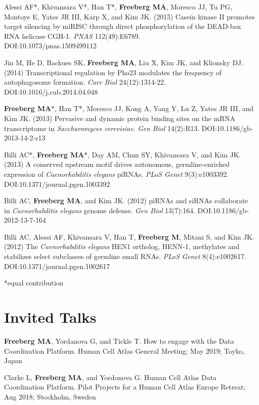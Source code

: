 \documentclass[margin,line]{res}
\begin{document}
\begin{resume}
Alessi AF*, Khivansara V*, Han T*, {\bf Freeberg MA}, Moresco JJ, Tu PG, Montoye E, Yates JR III, Karp X, and Kim JK. (2015) Casein kinase II promotes target silencing by miRISC through direct phosphorylation of the DEAD-box RNA helicase CGH-1. {\em PNAS} 112(49):E6789. \\DOI:10.1073/pnas.1509499112

Jin M, He D, Backues SK, {\bf Freeberg MA}, Liu X, Kim JK, and Klionsky DJ. (2014) Transcriptional regulation by Pho23 modulates the frequency of autophagosome formation. {\em Curr Biol} 24(12):1314-22. DOI:10.1016/j.cub.2014.04.048

{\bf Freeberg MA}*, Han T*, Moresco JJ, Kong A, Yang Y, Lu Z, Yates JR III, and Kim JK. (2013) Pervasive and dynamic protein binding sites on the mRNA transcriptome in {\em Saccharomyces cerevisiae}. {\em Gen Biol} 14(2):R13. DOI:10.1186/gb-2013-14-2-r13

Billi AC*, {\bf Freeberg MA}*, Day AM, Chun SY, Khivansara V, and Kim JK. (2013) A conserved upstream motif drives autonomous, germline-enriched expression of {\em Caenorhabditis elegans} piRNAs. {\em PLoS Genet} 9(3):e1003392. DOI:10.1371/journal.pgen.1003392

Billi AC, {\bf Freeberg MA}, and Kim JK. (2012) piRNAs and siRNAs collaborate in {\em Caenorhabditis elegans} genome defense. {\em Gen Biol} 13(7):164. DOI:10.1186/gb-2012-13-7-164

Billi AC, Alessi AF, Khivansara V, Han T, {\bf Freeberg M}, Mitani S, and Kim JK. (2012) The {\em Caenorhabditis elegans} HEN1 ortholog, HENN-1, methylates and stabilizes select subclasses of germline small RNAs. {\em PLoS Genet} 8(4):e1002617. DOI:10.1371/journal.pgen.1002617

*equal contribution

\section{\sc Invited Talks}


{\bf Freeberg MA}, Yordanova G, and Tickle T. How to engage with the Data Coordination Platform. Human Cell Atlas General Meeting; May 2019; Toyko, Japan

Clarke L, {\bf Freeberg MA}, and Yordonova G. Human Cell Atlas Data Coordination Platform. Pilot Projects for a Human Cell Atlas Europe Retreat; Aug 2018; Stockholm, Sweden


\end{resume}
\end{document}
